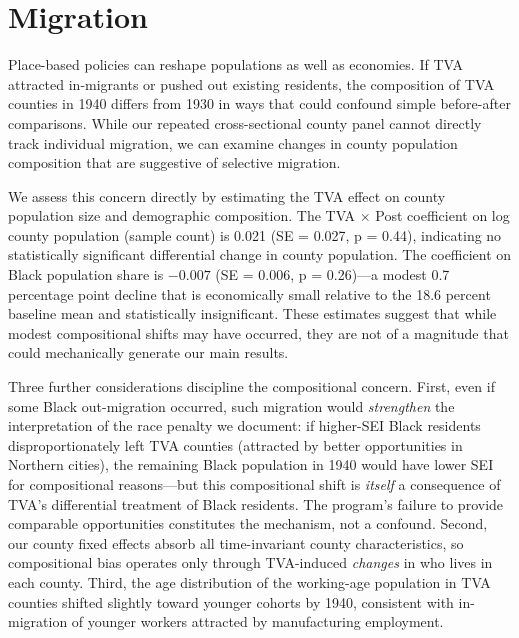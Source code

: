 \documentclass[12pt]{article}
\begin{document}
\section{Migration}\label{sec:migration}

Place-based policies can reshape populations as well as economies. If TVA attracted in-migrants or pushed out existing residents, the composition of TVA counties in 1940 differs from 1930 in ways that could confound simple before-after comparisons. While our repeated cross-sectional county panel cannot directly track individual migration, we can examine changes in county population composition that are suggestive of selective migration.

We assess this concern directly by estimating the TVA effect on county population size and demographic composition. The TVA $\times$ Post coefficient on log county population (sample count) is 0.021 (SE = 0.027, p = 0.44), indicating no statistically significant differential change in county population. The coefficient on Black population share is $-0.007$ (SE = 0.006, p = 0.26)---a modest 0.7 percentage point decline that is economically small relative to the 18.6 percent baseline mean and statistically insignificant. These estimates suggest that while modest compositional shifts may have occurred, they are not of a magnitude that could mechanically generate our main results.

Three further considerations discipline the compositional concern. First, even if some Black out-migration occurred, such migration would \textit{strengthen} the interpretation of the race penalty we document: if higher-SEI Black residents disproportionately left TVA counties (attracted by better opportunities in Northern cities), the remaining Black population in 1940 would have lower SEI for compositional reasons---but this compositional shift is \textit{itself} a consequence of TVA's differential treatment of Black residents. The program's failure to provide comparable opportunities constitutes the mechanism, not a confound. Second, our county fixed effects absorb all time-invariant county characteristics, so compositional bias operates only through TVA-induced \textit{changes} in who lives in each county. Third, the age distribution of the working-age population in TVA counties shifted slightly toward younger cohorts by 1940, consistent with in-migration of younger workers attracted by manufacturing employment.
\end{document}
